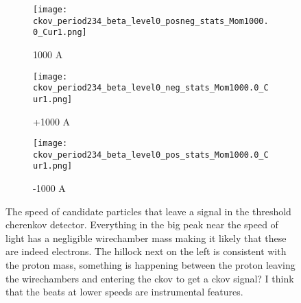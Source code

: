    \begin{figure}[h]	
 \centering   
               \begin{subfigure}[b]{0.3\textwidth}
            \centering
            \texttt{[image: ckov\_period234\_beta\_level0\_posneg\_stats\_Mom1000.0\_Cur1.png]}
            \caption{1000 A}
            \end{subfigure}
             \hfill   
            \begin{subfigure}[b]{0.3\textwidth}
            \centering
            \texttt{[image: ckov\_period234\_beta\_level0\_neg\_stats\_Mom1000.0\_Cur1.png]}
            \caption{+1000 A}
            \end{subfigure}
             \hfill   
            \begin{subfigure}[b]{0.3\textwidth}
            \centering
            \texttt{[image: ckov\_period234\_beta\_level0\_pos\_stats\_Mom1000.0\_Cur1.png]}
            \caption{-1000 A}
            \end{subfigure}
  

            
\caption{The speed of candidate particles that leave a signal in the threshold cherenkov detector. Everything in the big peak near the speed of light has a negligible wirechamber mass making it likely that these are indeed electrons. The hillock next on the left is consistent with the proton mass, something is happening between the proton leaving the wirechambers and entering the ckov  to get a ckov signal? I think that the beats at lower speeds are instrumental features.  }
\label{fig_beta-ckov}
  \end{figure}
  

